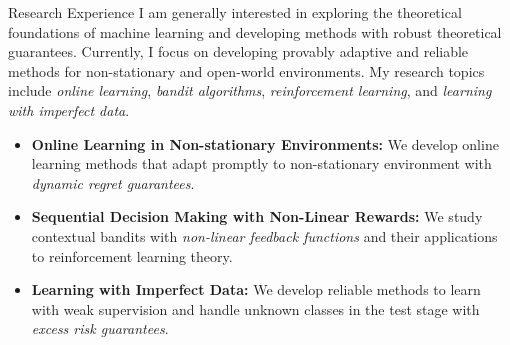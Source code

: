 \documentclass{resume} %
\begin{document}
\begin{rSection}{Research Experience}
	I am generally interested in exploring the theoretical foundations of machine learning and developing methods with robust theoretical guarantees. Currently, I focus on developing provably adaptive and reliable methods for non-stationary and open-world environments. My research topics include \emph{online learning}, \emph{bandit algorithms}, \emph{reinforcement learning}, and \emph{learning with imperfect data}.
\begin{itemize}
	\item \textbf{Online Learning in Non-stationary Environments:} We develop online learning methods that adapt promptly to non-stationary environment with \emph{dynamic regret guarantees}.
	\item \textbf{Sequential Decision Making with Non-Linear Rewards:} We study contextual bandits with \emph{non-linear feedback functions} and their applications to reinforcement learning theory.
	\item \textbf{Learning with Imperfect Data:} We develop reliable methods to learn with weak supervision and handle unknown classes in the test stage with \emph{excess risk guarantees}.
\end{itemize}
\end{rSection}
	
\end{document}

